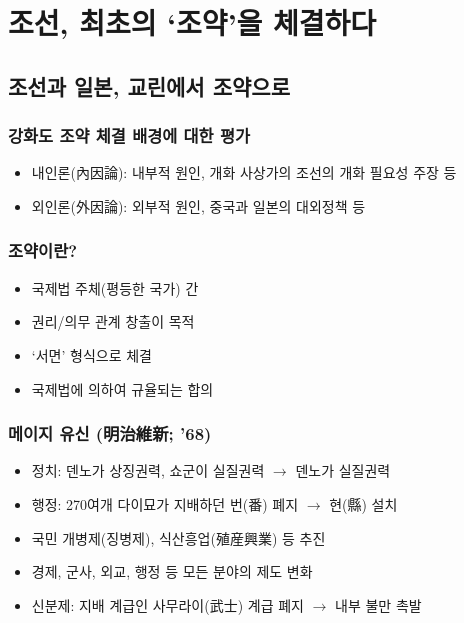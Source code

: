 \section{조선, 최초의 `조약'을 체결하다}

\subsection{조선과 일본, 교린에서 조약으로}

\subsubsection*{강화도 조약 체결 배경에 대한 평가}
\begin{itemize}
    \item 내인론(內因論): 내부적 원인, 개화 사상가의 조선의 개화 필요성 주장 등
    \item 외인론(外因論): 외부적 원인, 중국과 일본의 대외정책 등
\end{itemize}

\subsubsection*{조약이란?}
\begin{itemize}
    \item 국제법 주체(평등한 국가) 간
    \item 권리/의무 관계 창출이 목적
    \item `서면' 형식으로 체결
    \item 국제법에 의하여 규율되는 합의
\end{itemize}

\subsubsection*{메이지 유신 (明治維新; '68)}
\begin{itemize}
    \item 정치: 덴노가 상징권력, 쇼군이 실질권력 $\rightarrow$ 덴노가 실질권력
    \item 행정: 270여개 다이묘가 지배하던 번(番) 폐지 $\rightarrow$ 현(縣) 설치
    \item 국민 개병제(징병제), 식산흥업(殖産興業) 등 추진
    \item 경제, 군사, 외교, 행정 등 모든 분야의 제도 변화
    \item 신분제: 지배 계급인 사무라이(武士) 계급 폐지 $\rightarrow$ 내부 불만 촉발
\end{itemize}

